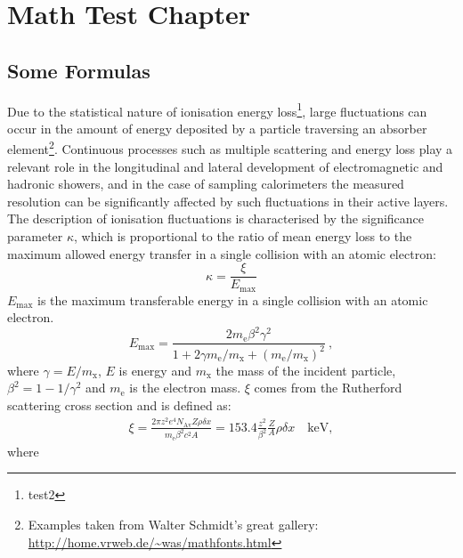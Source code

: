 
\chapter{Math Test Chapter} %

\label{ch:mathtest} %


\lipsum[13]


\section{Some Formulas}

Due to the statistical nature of ionisation energy loss\footnote{test2}, large fluctuations can occur in the amount of energy deposited by a particle traversing an absorber element\footnote{Examples taken from Walter Schmidt's great gallery: \\ \url{http://home.vrweb.de/~was/mathfonts.html}}.  Continuous processes such as multiple scattering and energy loss play a relevant role in the longitudinal and lateral development of electromagnetic and hadronic showers, and in the case of sampling calorimeters the measured resolution can be significantly affected by such fluctuations in their active layers.  The description of ionisation fluctuations is characterised by the significance parameter $\kappa$, which is proportional to the ratio of mean energy loss to the maximum allowed energy transfer in a single collision with an atomic electron: 
\begin{equation}
\kappa =\frac{\xi}{E_{\mathrm{max}}} %
\end{equation}
$E_{\mathrm{max}}$ is the maximum transferable energy in a single collision with an atomic electron.
\[E_{\mathrm{max}} =\frac{2 m_{\mathrm{e}} \beta^2\gamma^2 }{1 + 2\gamma m_{\mathrm{e}}/m_{\mathrm{x}} + \left ( m_{\mathrm{e}} /m_{\mathrm{x}}\right)^2}\ ,\]
where $\gamma = E/m_{\mathrm{x}}$, $E$ is energy and $m_{\mathrm{x}}$ the mass of the incident particle, $\beta^2 = 1 - 1/\gamma^2$ and $m_{\mathrm{e}}$ is the electron mass. $\xi$ comes from the Rutherford scattering cross section and is defined as:
\begin{eqnarray*} \xi  = \frac{2\pi z^2 e^4 N_{\mathrm{Av}} Z \rho
\delta x}{m_{\mathrm{e}} \beta^2 c^2 A} =  153.4 \frac{z^2}{\beta^2}
\frac{Z}{A}
\rho \delta x \quad\mathrm{keV},
\end{eqnarray*}
where


